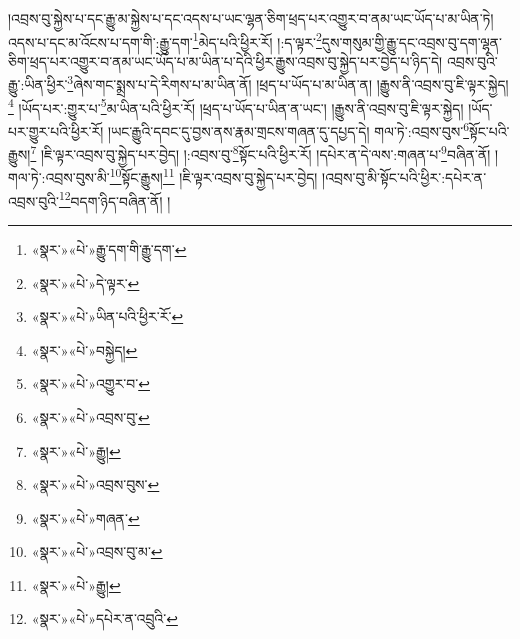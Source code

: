 །འབྲས་བུ་སྐྱེས་པ་དང་རྒྱུ་མ་སྐྱེས་པ་དང་འདས་པ་ཡང་ལྷན་ཅིག་ཕྲད་པར་འགྱུར་བ་ནམ་ཡང་ཡོད་པ་མ་ཡིན་ཏེ། འདས་པ་དང་མ་འོངས་པ་དག་གི་:རྒྱུ་དག་\footnote{«སྣར་»«པེ་»རྒྱུ་དག་གི་རྒྱུ་དག་}མེད་པའི་ཕྱིར་རོ། །:ད་ལྟར་\footnote{«སྣར་»«པེ་»དེ་ལྟར་}དུས་གསུམ་གྱི་རྒྱུ་དང་འབྲས་བུ་དག་ལྷན་ཅིག་ཕྲད་པར་འགྱུར་བ་ནམ་ཡང་ཡོད་པ་མ་ཡིན་པ་དེའི་ཕྱིར་རྒྱུས་འབྲས་བུ་སྐྱེད་པར་བྱེད་པ་ཉིད་དེ། འབྲས་བུའི་རྒྱུ་:ཡིན་ཕྱིར་\footnote{«སྣར་»«པེ་»ཡིན་པའི་ཕྱིར་རོ་}ཞེས་གང་སྨྲས་པ་དེ་རིགས་པ་མ་ཡིན་ནོ། །ཕྲད་པ་ཡོད་པ་མ་ཡིན་ན། །རྒྱུས་ནི་འབྲས་བུ་ཇི་ལྟར་སྐྱེད།\footnote{«སྣར་»«པེ་»བསྐྱེད།} །ཡོད་པར་:གྱུར་པ་\footnote{«སྣར་»«པེ་»འགྱུར་བ་}མ་ཡིན་པའི་ཕྱིར་རོ། །ཕྲད་པ་ཡོད་པ་ཡིན་ན་ཡང་། །རྒྱུས་ནི་འབྲས་བུ་ཇི་ལྟར་སྐྱེད། །ཡོད་པར་གྱུར་པའི་ཕྱིར་རོ། །ཡང་རྒྱུའི་དབང་དུ་བྱས་ནས་རྣམ་གྲངས་གཞན་དུ་དཔྱད་དེ། གལ་ཏེ་:འབྲས་བུས་\footnote{«སྣར་»«པེ་»འབྲས་བུ་}སྟོང་པའི་རྒྱུས།\footnote{«སྣར་»«པེ་»རྒྱུ།} །ཇི་ལྟར་འབྲས་བུ་སྐྱེད་པར་བྱེད། །:འབྲས་བུ་\footnote{«སྣར་»«པེ་»འབྲས་བུས་}སྟོང་པའི་ཕྱིར་རོ། །དཔེར་ན་དེ་ལས་:གཞན་པ་\footnote{«སྣར་»«པེ་»གཞན་}བཞིན་ནོ། །གལ་ཏེ་:འབྲས་བུས་མི་\footnote{«སྣར་»«པེ་»འབྲས་བུ་མ་}སྟོང་རྒྱུས།\footnote{«སྣར་»«པེ་»རྒྱུ།} །ཇི་ལྟར་འབྲས་བུ་སྐྱེད་པར་བྱེད། །འབྲས་བུ་མི་སྟོང་པའི་ཕྱིར་:དཔེར་ན་འབྲས་བུའི་\footnote{«སྣར་»«པེ་»དཔེར་ན་འབྲུའི་}བདག་ཉིད་བཞིན་ནོ། །
